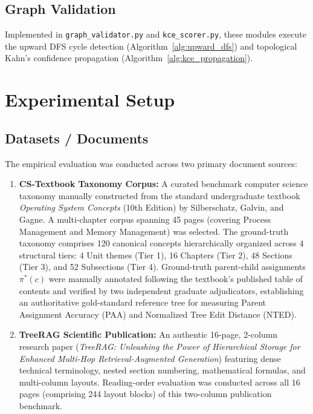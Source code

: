 \documentclass[12pt,a4paper]{report}
\begin{document}
\subsection{Graph Validation}
Implemented in \texttt{graph\_validator.py} and \texttt{kce\_scorer.py}, these modules execute the upward DFS \cite{tarjan1972depth} cycle detection (Algorithm~\ref{alg:upward_dfs}) and topological Kahn's confidence propagation \cite{kahn1962topological} (Algorithm~\ref{alg:kce_propagation}).

\section{Experimental Setup}

\subsection{Datasets / Documents}
The empirical evaluation was conducted across two primary document sources:
\begin{enumerate}
    \item \textbf{CS-Textbook Taxonomy Corpus:} A curated benchmark computer science taxonomy manually constructed from the standard undergraduate textbook \textit{Operating System Concepts} (10th Edition) by Silberschatz, Galvin, and Gagne. A multi-chapter corpus spanning 45 pages (covering Process Management and Memory Management) was selected. The ground-truth taxonomy comprises 120 canonical concepts hierarchically organized across 4 structural tiers: 4 Unit themes (Tier 1), 16 Chapters (Tier 2), 48 Sections (Tier 3), and 52 Subsections (Tier 4). Ground-truth parent-child assignments $\pi^*(c)$ were manually annotated following the textbook's published table of contents and verified by two independent graduate adjudicators, establishing an authoritative gold-standard reference tree for measuring Parent Assignment Accuracy (PAA) and Normalized Tree Edit Distance (NTED).
    \item \textbf{TreeRAG Scientific Publication:} An authentic 16-page, 2-column research paper (\textit{TreeRAG: Unleashing the Power of Hierarchical Storage for Enhanced Multi-Hop Retrieval-Augmented Generation}) \cite{tao2025treerag} featuring dense technical terminology, nested section numbering, mathematical formulas, and multi-column layouts. Reading-order evaluation was conducted across all 16 pages (comprising 244 layout blocks) of this two-column publication benchmark.
\end{enumerate}
\end{document}

